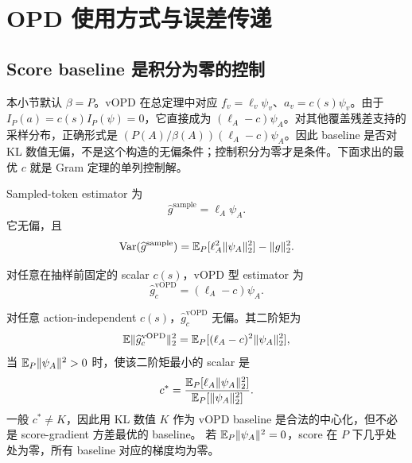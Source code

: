 \section{OPD 使用方式与误差传递}
\label{est:sec:kl-opd-roles}
\subsection{Score baseline 是积分为零的控制}

本小节默认 $\beta=P$。vOPD 在总定理中对应 $f_v=\ell_v\psi_v$、$a_v=c(s)\psi_v$。由于 $I_P(a)=c(s)I_P(\psi)=0$，它直接成为 $(\ell_A-c)\psi_A$。对其他覆盖残差支持的采样分布，正确形式是 $(P(A)/\beta(A))(\ell_A-c)\psi_A$。因此 baseline 是否对 KL 数值无偏，不是这个构造的无偏条件；控制积分为零才是条件。下面求出的最优 $c$ 就是 Gram 定理的单列控制解。


Sampled-token estimator 为
\begin{equation*}
 \widehat g^{\mathrm{sample}}=\ell_A\psi_A.
\end{equation*}
它无偏，且
\begin{equation}
 \operatorname{Var}(\widehat g^{\mathrm{sample}})
 =\mathbb E_P[\ell_A^2\lVert \psi_A\rVert_2^2]-\lVert g\rVert_2^2.
 \label{est:eq:chapter3-sample-grad-var}
\end{equation}

对任意在抽样前固定的 scalar $c(s)$，vOPD 型 estimator 为
\begin{equation}
 \widehat g^{\mathrm{vOPD}}_c=(\ell_A-c)\psi_A.
 \label{est:eq:chapter3-vopd}
\end{equation}

\begin{proposition}
\label{est:prop:chapter3-vopd}
对任意 action-independent $c(s)$，$\widehat g^{\mathrm{vOPD}}_c$ 无偏。其二阶矩为
\begin{equation*}
 \mathbb E\lVert\widehat g^{\mathrm{vOPD}}_c\rVert_2^2
 =\mathbb E_P[(\ell_A-c)^2\lVert \psi_A\rVert_2^2],
\end{equation*}
当 $\mathbb E_P\lVert \psi_A\rVert^2>0$ 时，使该二阶矩最小的 scalar 是
\begin{equation}
 c^*=\frac{\mathbb E_P[\ell_A\lVert \psi_A\rVert_2^2]}{\mathbb E_P[\lVert \psi_A\rVert_2^2]}.
 \label{est:eq:chapter3-optimal-score-baseline}
\end{equation}
一般 $c^*\neq K$，因此用 KL 数值 $K$ 作为 vOPD baseline 是合法的中心化，但不必是 score-gradient 方差最优的 baseline。
若 $\mathbb E_P\lVert \psi_A\rVert^2=0$，score 在 $P$ 下几乎处处为零，所有 baseline 对应的梯度均为零。
\end{proposition}

